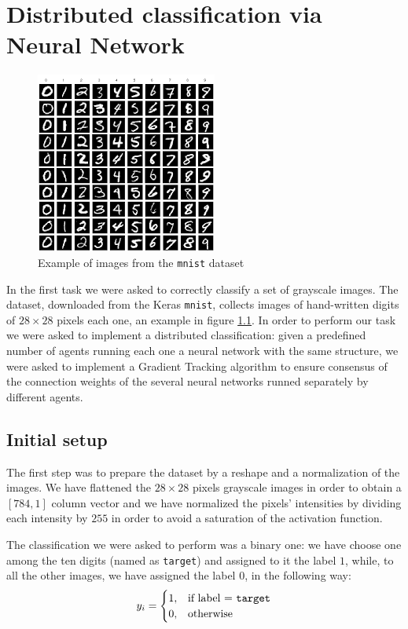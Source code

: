 \documentclass[a4paper,11pt,oneside]{book}
\begin{document}
\chapter{Distributed classification via Neural Network}

\begin{figure}
	\centering
	\includegraphics[scale=0.5]{mnist}
	\caption{Example of images from the \texttt{mnist} dataset}
	\label{mnist}
\end{figure}


In the first task we were asked to correctly classify a set of grayscale images. The dataset, downloaded from the Keras \texttt{mnist}, collects images of hand-written digits of $28\times28$ pixels each one, an example in figure \ref{mnist}. In order to perform our task we were asked to implement a distributed classification: given a predefined number of agents running each one a neural network with the same structure, we were asked to implement a Gradient Tracking algorithm to ensure consensus of the connection weights of the several neural networks runned separately by different agents.

\section{Initial setup}
The first step was to prepare the dataset by a reshape and a normalization of the images. We have flattened the $28\times28$ pixels grayscale images in order to obtain a $[784,1]$ column vector and we have normalized the pixels' intensities by dividing each intensity by $255$ in order to avoid a saturation of the activation function.

The classification we were asked to perform was a binary one: we have choose one among the ten digits (named as \texttt{target}) and assigned to it the label $1$, while, to all the other images, we have assigned the label $0$, in the following way:
\begin{equation}
y_i = 
\begin{cases}
1, & \text{if label = \texttt{target}} \\
0, & \text{otherwise}
\end{cases}
\end{equation}
\end{document}

